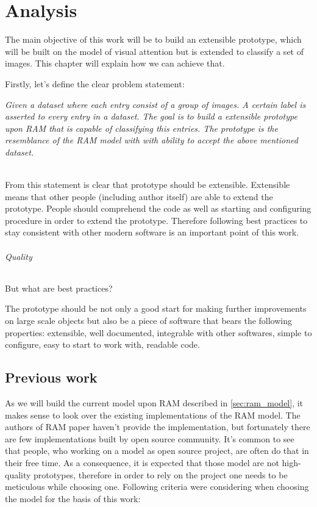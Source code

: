 \chapter{Analysis}

The main objective of this work will be to build an extensible prototype,
which will be built on the model of visual attention but is extended to classify
a set of images. This chapter will explain how we can achieve that.

Firstly, let's define the clear problem statement:

\textit{
	Given a dataset where each entry consist of a group of images.
	A certain label is asserted to every entry in a dataset. The goal is
	to build a extensible prototype upon RAM that is capable of classifying
	this entries. The prototype is the resemblance of the RAM model with
	with ability to accept the above mentioned dataset.
}

\\
From this statement is clear that prototype should be extensible. Extensible
means that other people (including author itself) are able to extend the
prototype. People should comprehend the code as well as starting and configuring
procedure in order to extend the prototype. Therefore following best practices
to stay consistent with other modern software is an important point of
this work.
\subparagraph{Quality} But what are best practices?

The prototype should be not only a good start for making further improvements
on large scale objects but also be a piece of software that bears the
following properties: extensible, well documented, integrable with other
softwares, simple to configure, easy to start to work with,
readable code.



\section{Previous work}
As we will build the current model upon RAM described
in \autoref{sec:ram_model}, it makes sense to look over the existing implementations
of the RAM model.
The authors of RAM paper haven't provide the implementation, but
fortunately there are few implementations built by open source community.
It's common to see that people, who working on a model as open source project,
are often do that in their free time. As a consequence, it is expected that those model
are not high-quality prototypes, therefore in order to rely on the project
one needs to be meticulous while choosing one.
Following criteria were considering when choosing the model for the basis
of this work:

